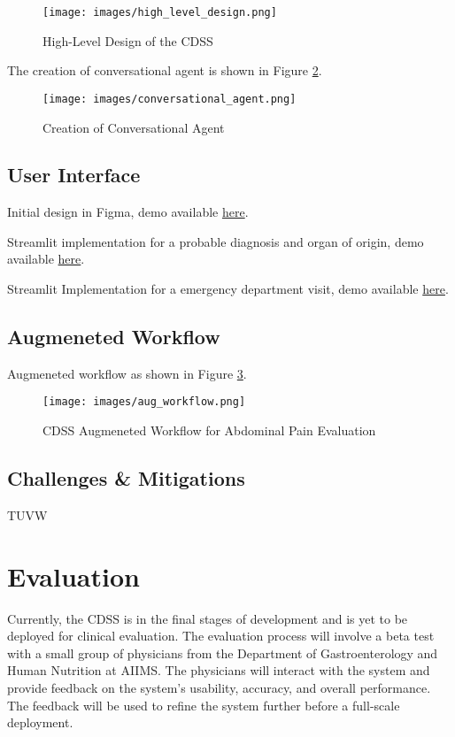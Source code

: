 \begin{figure}[H]
    \centering
    \texttt{[image: images/high\_level\_design.png]}
    \caption{High-Level Design of the CDSS}
    \label{fig:high_level_design}
\end{figure}

The creation of conversational agent is shown in Figure \ref{fig:conversational_agent}.
\begin{figure}[H]
    \centering
    \texttt{[image: images/conversational\_agent.png]}
    \caption{Creation of Conversational Agent}
    \label{fig:conversational_agent}
\end{figure}

\subsection{User Interface}
Initial design in Figma, demo available \href{https://kutumlab.github.io/abdominal-pain-cdss/#mobile-application}{here}.

Streamlit implementation for a probable diagnosis and organ of origin, demo available \href{https://kutumlab.github.io/abdominal-pain-cdss/#web-application-diagnosis}{here}.

Streamlit Implementation for a emergency department visit, demo available \href{https://kutumlab.github.io/abdominal-pain-cdss/#web-application-emergency-visit}{here}.

\subsection{Augmeneted Workflow}
Augmeneted workflow as shown in Figure \ref{fig:aug_workflow}.
\begin{figure}[H]
    \centering
    \texttt{[image: images/aug\_workflow.png]}
    \caption{CDSS Augmeneted Workflow for Abdominal Pain Evaluation}
    \label{fig:aug_workflow}
\end{figure}


\subsection{Challenges \& Mitigations}
TUVW %
\section{Evaluation}
Currently, the CDSS is in the final stages of development and is yet to be deployed for clinical evaluation. The evaluation process will involve a beta test with a small group of physicians from the Department of Gastroenterology and Human Nutrition at AIIMS. The physicians will interact with the system and provide feedback on the system's usability, accuracy, and overall performance. The feedback will be used to refine the system further before a full-scale deployment.\\[\baselineskip]